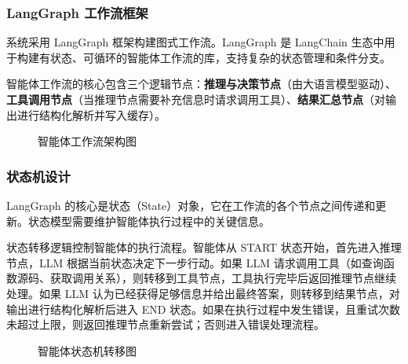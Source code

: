 \subsubsection{LangGraph 工作流框架}

系统采用 LangGraph 框架构建图式工作流。LangGraph 是 LangChain 生态中用于构建有状态、可循环的智能体工作流的库，支持复杂的状态管理和条件分支。

智能体工作流的核心包含三个逻辑节点：\textbf{推理与决策节点}（由大语言模型驱动）、\textbf{工具调用节点}（当推理节点需要补充信息时请求调用工具）、\textbf{结果汇总节点}（对输出进行结构化解析并写入缓存）。

\begin{figure}[htbp]
\centering
{}
\caption{智能体工作流架构图}
\label{fig:agent-workflow}
\end{figure}

\subsubsection{状态机设计}

LangGraph 的核心是状态（State）对象，它在工作流的各个节点之间传递和更新。状态模型需要维护智能体执行过程中的关键信息。

状态转移逻辑控制智能体的执行流程。智能体从 START 状态开始，首先进入推理节点，LLM 根据当前状态决定下一步行动。如果 LLM 请求调用工具（如查询函数源码、获取调用关系），则转移到工具节点，工具执行完毕后返回推理节点继续处理。如果 LLM 认为已经获得足够信息并给出最终答案，则转移到结果节点，对输出进行结构化解析后进入 END 状态。如果在执行过程中发生错误，且重试次数未超过上限，则返回推理节点重新尝试；否则进入错误处理流程。

\begin{figure}[htbp]
\centering
{}
\caption{智能体状态机转移图}
\label{fig:agent-state-machine}
\end{figure}
